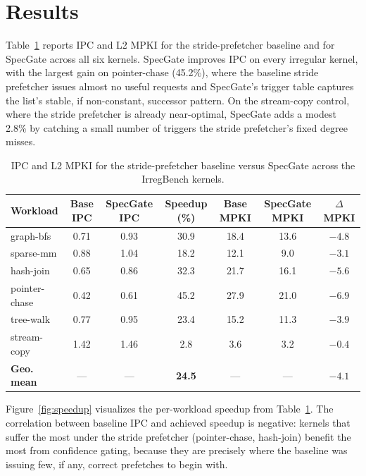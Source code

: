 \section{Results}
Table~\ref{tab:results} reports IPC and L2 MPKI for the stride-prefetcher baseline and for SpecGate across all six kernels. SpecGate improves IPC on every irregular kernel, with the largest gain on pointer-chase (45.2\%), where the baseline stride prefetcher issues almost no useful requests and SpecGate's trigger table captures the list's stable, if non-constant, successor pattern. On the stream-copy control, where the stride prefetcher is already near-optimal, SpecGate adds a modest 2.8\% by catching a small number of triggers the stride prefetcher's fixed degree misses.

\begin{table}[t]
  \centering
  \caption{IPC and L2 MPKI for the stride-prefetcher baseline versus SpecGate across the IrregBench kernels.}
  \label{tab:results}
  \begin{tabular}{lcccccc}
    \toprule
    \textbf{Workload} & \textbf{Base IPC} & \textbf{SpecGate IPC} & \textbf{Speedup (\%)} & \textbf{Base MPKI} & \textbf{SpecGate MPKI} & \textbf{$\Delta$MPKI} \\
    \midrule
    graph-bfs      & 0.71 & 0.93 & 30.9 & 18.4 & 13.6 & $-4.8$ \\
    sparse-mm      & 0.88 & 1.04 & 18.2 & 12.1 & 9.0  & $-3.1$ \\
    hash-join      & 0.65 & 0.86 & 32.3 & 21.7 & 16.1 & $-5.6$ \\
    pointer-chase  & 0.42 & 0.61 & 45.2 & 27.9 & 21.0 & $-6.9$ \\
    tree-walk      & 0.77 & 0.95 & 23.4 & 15.2 & 11.3 & $-3.9$ \\
    stream-copy    & 1.42 & 1.46 & 2.8  & 3.6  & 3.2  & $-0.4$ \\
    \midrule
    \textbf{Geo. mean} & --- & --- & \textbf{24.5} & --- & --- & \textbf{$-4.1$} \\
    \bottomrule
  \end{tabular}
\end{table}

Figure~\ref{fig:speedup} visualizes the per-workload speedup from Table~\ref{tab:results}. The correlation between baseline IPC and achieved speedup is negative: kernels that suffer the most under the stride prefetcher (pointer-chase, hash-join) benefit the most from confidence gating, because they are precisely where the baseline was issuing few, if any, correct prefetches to begin with.

